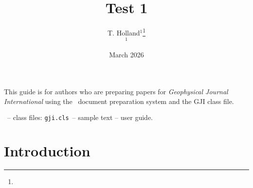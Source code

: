 \documentclass{gji}
\title[Test]
  {Test 1}
\author[T. Holland]
  {T. Holland$^1$\thanks{} \\
  $^1$   }
\date{March 2026}
\begin{document}
\label{firstpage}

\maketitle


\begin{summary}
 This guide is for authors who are preparing papers for
 \textit{Geophysical Journal International} using the
\LaTeXe\ document preparation system and the GJI class file.
\end{summary}

\begin{keywords}
 \LaTeXe\ -- class files: \verb"gji.cls"\ -- sample text -- user guide.
\end{keywords}

\section{Introduction}
\end{document}
